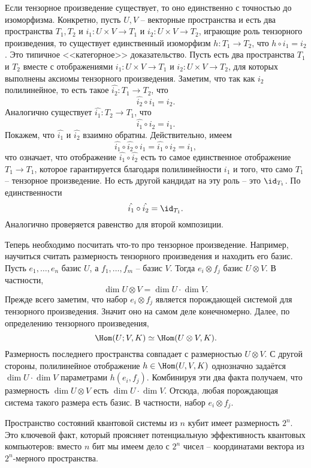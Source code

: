 \utv Если тензорное произведение существует, то оно единственно с точностью до изоморфизма. Конкретно, пусть $U,V$ -- векторные пространства и есть два пространства $T_1,T_2$ и $i_1 \colon U\times V \to T_1$ и $i_2\colon U\times V \to T_2$, играющие роль тензорного произведения, то существует единственный изоморфизм $h\colon T_1\to T_2$, что $h\circ i_1=i_2$.
\proof Это типичное <<категорное>> доказательство. Пусть есть два пространства $T_1$ и $T_2$ вместе с отображениями $i_1 \colon U\times V \to T_1$ и $i_2 \colon  U\times V \to T_2$, для которых выполнены аксиомы тензорного произведения. Заметим, что так как $i_2$ полилинейное, то есть такое $\hat{i_2} \colon T_1 \to T_2$, что $$\hat{i_2}\circ i_1= i_2.$$ 
Аналогично существует $\hat{i_1} \colon T_2 \to T_1$, что
$$\hat{i_1}\circ i_2= i_1.$$ 
Покажем, что $\hat{i_1} $ и $\hat{i_2}$ взаимно обратны. Действительно, имеем
$$\hat{i_1}\circ \hat{i_2}\circ i_1= \hat{i_1}\circ i_2= i_1,$$
что означает, что отображение $\hat{i_1}\circ \hat{i_2}$ есть то самое единственное отображение $T_1\to T_1$, которое гарантируется благодаря полилинейности $i_1$ и того, что само $T_1$ -- тензорное произведение. Но есть другой кандидат на эту роль -- это $\id_{T_1}$. По единственности 
$$\hat{i_1}\circ \hat{i_2}=\id_{T_1}.$$
Аналогично проверяется равенство для второй композиции.
\endproof
\eutv





Теперь необходимо посчитать что-то про тензорное произведение. Например, научиться считать размерность тензорного произведения и находить его базис.
\thrm Пусть $e_1,\dots,e_n$ базис $U$, а $f_1,\dots,f_m$ -- базис $V$. Тогда $e_i\otimes f_j$ базис $U \otimes V$. В частности, 
$$\dim U \otimes V= \dim U \cdot \dim V.$$ 
\proof Прежде всего заметим, что набор $e_i \otimes f_j$ является порождающей системой для тензорного произведения. Значит оно на самом деле конечномерно. Далее, по определению тензорного произведения,
$$\Hom(U;V, K) \simeq \Hom(U\otimes  V,K).$$
Размерность последнего пространства совпадает с размерностью $U\otimes V$. С другой стороны, полилинейное отображение $h \in \Hom(U,V, K)$ однозначно задаётся $\dim U \cdot \dim V$  параметрами $h(e_i,f_j)$. Комбинируя эти два факта получаем, что размерность $\dim U \otimes V$ есть $\dim U \cdot \dim V$. Отсюда, любая порождающая система такого размера есть базис. В частности, набор $e_i \otimes f_j$.
\endproof
\ethrm


\rm Пространство состояний квантовой системы из $n$ кубит имеет размерность $2^n$. Это ключевой факт, который проясняет потенциальную эффективность квантовых компьютеров: вместо $n$ бит мы имеем дело с $2^n$ чисел -- координатами вектора из $2^n$-мерного пространства.
\erm


